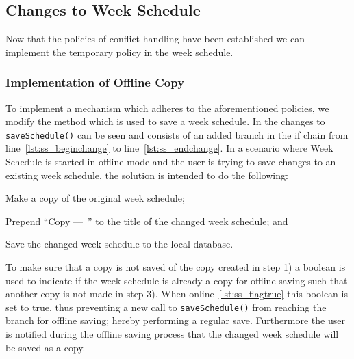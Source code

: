 \subsection{Changes to Week Schedule}
Now that the policies of conflict handling have been established we can implement the temporary policy in the week schedule.

\subsubsection{Implementation of Offline Copy}
To implement a mechanism which adheres to the aforementioned policies, we modify the method which is used to save a week schedule.
In  the changes to \texttt{saveSchedule()} can be seen and consists of an added branch in the if chain from line~\ref{lst:ss_beginchange} to line~\ref{lst:ss_endchange}.
In a scenario where Week Schedule is started in offline mode and the user is trying to save changes to an existing week schedule, the solution is intended to do the following:
\begin{enumberate}
\item Make a copy of the original week schedule;
\item Prepend \enquote{Copy ---~} to the title of the changed week schedule; and
\item Save the changed week schedule to the local database.
\end{enumberate}

To make sure that a copy is not saved of the copy created in step 1) a boolean is used to indicate if the week schedule is already a copy for offline saving such that another copy is not made in step 3).
When online~\ref{lst:ss_flagtrue} this boolean is set to true, thus preventing a new call to \texttt{saveSchedule()} from reaching the branch for offline saving; hereby performing a regular save.
Furthermore the user is notified during the offline saving process that the changed week schedule will be saved as a copy.

